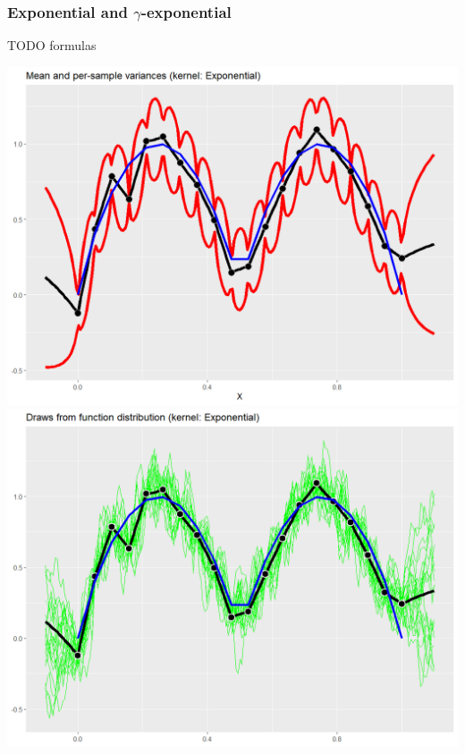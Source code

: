 \documentclass[10pt]{article}
\begin{document}

\subsubsection{Exponential and $\gamma$-exponential}
TODO formulas 

\includegraphics[height=0.5\textwidth]{exp_variances.png} \\
\includegraphics[height=0.5\textwidth]{exp_draws.png} \\
\end{document}
